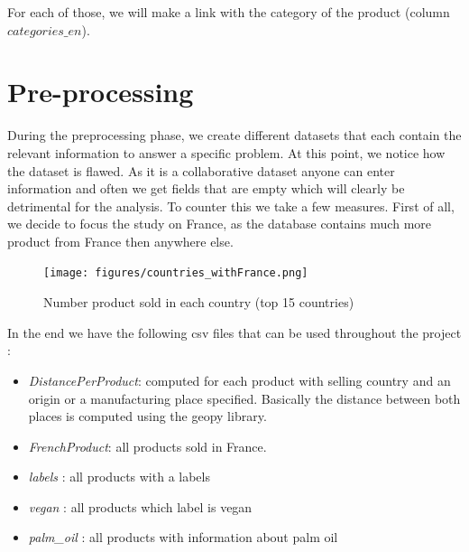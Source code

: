 \documentclass[11pt]{article}
\begin{document}
\noindent
For each of those, we will make a link with the category of the product (column $categories\_en$).

\section{Pre-processing}
During the preprocessing phase, we create different datasets that each contain the relevant information to answer a specific problem. %
At this point, we notice how the dataset is flawed. As it is a collaborative dataset anyone can enter information and often we get fields that are empty which will clearly be detrimental for the analysis. To counter this we take a few measures. First of all, we decide to focus the study on France, as the database contains much more product from France then anywhere else. 
\vspace{-0.3cm}

\begin{figure}[h]
\centering
\texttt{[image: figures/countries\_withFrance.png]}
\label{fig:fig1a}
\caption{Number product sold in each country (top 15 countries)}
\label{fig:fig1}
\end{figure}

\noindent
In the end we have the following csv files that can be used throughout the project : 


\begin{itemize}
    \item \textit{DistancePerProduct}: computed for each product with selling country and an origin or a manufacturing place specified. Basically the distance between both places is computed using the geopy library.
    \vspace{-0.3cm}
    \item \textit{FrenchProduct}: all products sold in France.
    \vspace{-0.3cm}
    \item \textit{labels} : all products with a labels
    \vspace{-0.3cm}
    \item \textit{vegan} : all products which label is vegan
    \vspace{-0.3cm}
    \item \textit{palm\_oil} : all products with information about palm oil
\end{itemize}
\end{document}
